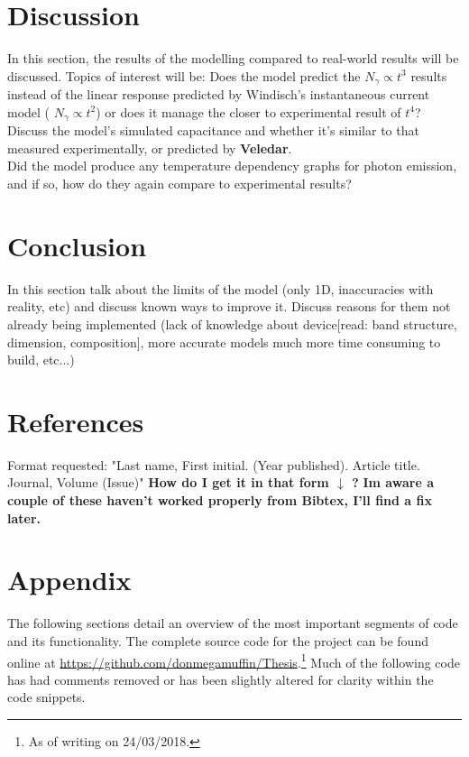 \documentclass[titlepage]{article}
\begin{document}
\section{Discussion}
In this section, the results of the modelling compared to real-world results will be discussed. Topics of interest will be: Does the model predict the $N_{\gamma} \propto t^{3} $ results instead of the linear response predicted by Windisch's instantaneous current model ( $N_{\gamma} \propto t^{2} $) or does it manage the closer to experimental result of $t^{4}$?\\
Discuss the model's simulated capacitance and whether it's similar to that measured experimentally, or predicted by \textbf{Veledar}.\\
Did the model produce any temperature dependency graphs for photon emission, and if so, how do they again compare to experimental results?

\section{Conclusion}
In this section talk about the limits of the model (only 1D, inaccuracies with reality, etc) and discuss known ways to improve it. Discuss reasons for them not already being implemented (lack of knowledge about device[read: band structure, dimension, composition], more accurate models much more time consuming to build, etc...) \\


\section{References}
Format requested: "Last name, First initial. (Year published). Article title. Journal, Volume (Issue)" \textbf{How do I get it in that form $\downarrow$ ?} \textbf{Im aware a couple of these haven't worked properly from Bibtex, I'll find a fix later.}
{}

\newpage

\section{Appendix}
The following sections detail an overview of the most important segments of code and its functionality. The complete source code for the project can be found online at \url{https://github.com/donmegamuffin/Thesis}.\footnote{As of writing on 24/03/2018.} Much of the following code has had comments removed or has been slightly altered for clarity within the code snippets.
\end{document}
